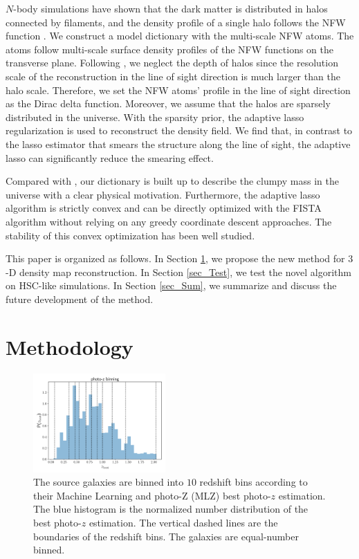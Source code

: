 \documentclass[twocolumn]{aastex62}
\begin{document}
$N$-body simulations have shown that the dark matter is distributed in halos
connected by filaments, and the density profile of a single halo follows the
NFW function \citep{halo-NFW1997ApJ}.  We construct a model dictionary with the
multi-scale NFW atoms.  The atoms follow multi-scale surface density profiles
of the NFW functions \citep{haloModel-TJ2003-3pt} on the transverse plane.
Following \citet{LSS-massMap-Glimpse3D-Leonard2014}, we neglect the depth of
halos since the resolution scale of the reconstruction in the line of sight
direction is much larger than the halo scale. Therefore, we set the NFW atoms'
profile in the line of sight direction as the Dirac delta function.  Moreover,
we assume that the halos are sparsely distributed in the universe.  With the
sparsity prior, the adaptive lasso regularization \citep{AdaLASSO-Zou2006} is
used to reconstruct the density field.  We find that, in contrast to the lasso
estimator that smears the structure along the line of sight, the adaptive lasso
can significantly reduce the smearing effect.

Compared with \citet{LSS-massMap-Glimpse3D-Leonard2014}, our dictionary is
built up to describe the clumpy mass in the universe with a clear physical
motivation. Furthermore, the adaptive lasso algorithm is strictly convex and
can be directly optimized with the FISTA algorithm \citep{FISTA-Beck2009}
without relying on any greedy coordinate descent approaches. The stability of
this convex optimization has been well studied.

This paper is organized as follows.
In Section \ref{sec_Method}, we propose the new method for $3$-D density map
reconstruction.
In Section \ref{sec_Test}, we test the novel algorithm on HSC-like simulations.
In Section \ref{sec_Sum}, we summarize and discuss the future development of
the method.

\section{Methodology}
\label{sec_Method}

\begin{figure}
 \centering
 \includegraphics[width=0.45\textwidth]{photo-z_binning.pdf}
 \caption{The source galaxies are binned into $10$ redshift bins according to
     their Machine Learning and photo-Z (MLZ) best photo-$z$ estimation. The
     blue histogram is the normalized number distribution of the best photo-$z$
     estimation. The vertical dashed lines are the boundaries of the redshift
     bins.  The galaxies are equal-number binned.
        } \label{fig_bestpz}
\end{figure}
\end{document}
